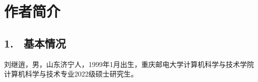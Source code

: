 







\specialsectioning


\chapter{作者简介}
\thispagestyle{others}
\pagestyle{others}
\xiaosi

\section{1. \ 基本情况}
刘继逍，男，山东济宁人，1999年1月出生，重庆邮电大学计算机科学与技术学院计算机科学与技术专业2022级硕士研究生。

